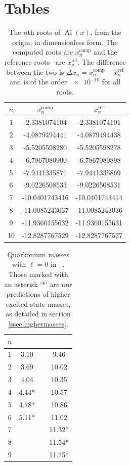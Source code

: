 \documentclass[]{article}
\newcommand{\Ai}[1]{\ensuremath{\operatorname{Ai}({#1})}}
\begin{document}
\section{Tables}

\begin{table}[H]
	\begin{center}
		\begin{tabular}{ c c c }
			$n$ & $x_{n}^{\mathrm{comp}}$ & $x_{n}^{\mathrm{ref}}$\\
			\hline
			1  & -2.3381074104  & -2.3381074101 \\
			2  & -4.0879494441  & -4.0879494438 \\
			3  & -5.5205598280  & -5.5205598278 \\
			4  & -6.7867080900  & -6.7867080898 \\
			5  & -7.9441335871  & -7.9441335869 \\
			6  & -9.0226508533  & -9.0226508531 \\
			7  & -10.0401743416 & -10.0401743414\\
			8  & -11.0085243037 & -11.0085243036\\
			9  & -11.9360155632 & -11.9360155631\\
			10 & -12.8287767529 & -12.8287767527
		\end{tabular}
		\caption{The $n$th roots of \Ai{x}, from the origin, in dimensionless form. The computed roots are $x_{n}^{\mathrm{comp}}$ and the reference roots~\cite{ref:abramowitz} are $x_{n}^{\mathrm{ref}}$. The difference between the two is $\Delta x_{n} = x_{n}^{\mathrm{comp}} - x_{n}^{\mathrm{ref}}$ and is of the order $\num{e-10}$ for all roots.}
		\label{tab:roots}
	\end{center}
\end{table}

\begin{table}[H]
	\begin{center}
		\begin{tabular}{ c c c c }
			$n$ & \ccbar & & \bbbar\\
			\hline
			1 & 3.10  & & 9.46 \\
			2 & 3.69  & & 10.02\\
			3 & 4.04  & & 10.35\\
			4 & 4.44* & & 10.57\\
			5 & 4.78* & & 10.86\\
			6 & 5.11* & & 11.02\\
			7 &       & & 11.32*\\
			8 &       & & 11.54*\\
			9 &       & & 11.75*\\
		\end{tabular}
		\caption{Quarkonium masses with $\ell = 0$ in \GeV~\cite{ref:gdaniell}. Those marked with an asterisk `*' are our predictions of higher excited state masses, as detailed in section \ref{ssec:highermasses}.}
		\label{tab:mesonmasses}
	\end{center}  
\end{table}
\end{document}
